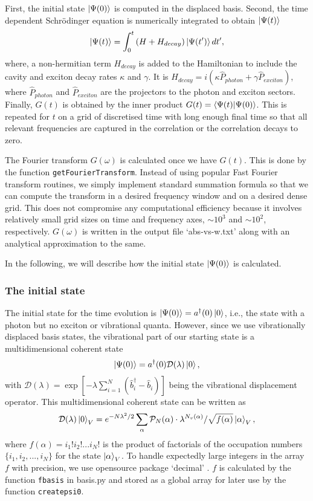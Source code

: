 \documentclass[final,twocolumn]{elsarticle}
\newcommand{\bd}{\hat{b}^\dagger}
\newcommand{\bn}{\hat{b}^{}}
\newcommand{\cntset}{\mathcal{P}_N}
\begin{document}
\begin{small}
First, the initial state $\ket{\Psi(0)}$ is computed in the displaced basis.
Second,
the time dependent 
Schr\"{o}dinger equation is numerically integrated
to obtain $\ket{\Psi(t)}$
\begin{displaymath}
\ket{\Psi(t)} = \int_0^t { (H+H_{decay})\ket{\Psi(t^\prime)} dt^\prime},
\end{displaymath}
where, 
a non-hermitian term $H_{decay}$ is added to the Hamiltonian 
to include the cavity and exciton decay rates
$\kappa$ and $\gamma$.
It is $H_{decay} = i (\kappa \hat P_{photon} + \gamma \hat P_{exciton}) $, where $ \hat P_{photon}$ and $ \hat P_{exciton}$ are the projectors to the photon and exciton sectors.
Finally, $G(t)$ is obtained by the inner product
$G(t) = \bra{\Psi(t)}\ket{\Psi(0)}$.
This is repeated for $t$ on a grid of discretised time with long enough final time so that all relevant frequencies are captured in the correlation or the correlation decays to 
zero. 

The Fourier transform $G(\omega)$ is calculated once we have $G(t)$.
This is done by the function \texttt{getFourierTransform}.
Instead of using popular Fast Fourier transform routines,
we simply implement standard summation formula
so that we can compute the transform in a desired frequency window
and on a desired dense grid. 
This does not compromise any computational efficiency
because it involves relatively small grid sizes on time and frequency axes, $\sim 10^3$ and $\sim 10^2$, respectively.
$G(\omega)$ is written in the output file 
`abs-vs-w.txt' along with an analytical approximation \cite{cwik} to the same.


In the following, we will describe how the initial state $\ket{\Psi(0)}$ is calculated.

\subsubsection{The initial state}
The initial state for the time evolution is $\ket{\Psi(0)}=a^\dagger(0) \ket{0}$, i.e.,
the state with a photon but no exciton or vibrational quanta.
However, since we use vibrationally displaced basis states,
the vibrational part of our starting state is a multidimensional coherent state
\begin{displaymath}
\ket{\Psi(0)}=a^\dagger(0)\mathcal{D}(\lambda)\ket{0},
\end{displaymath}
with $\mathcal{D}(\lambda)=\exp[-\lambda\sum_{i=1}^N{(\bd_i-\bn_i)}]$
being the vibrational
displacement operator.
This multidimensional coherent state can be written as
\begin{displaymath}
\mathcal{D}(\lambda)\ket{0}_V = e^{-N\lambda^2/2}\sum_\alpha{\cntset(\alpha)\cdot\lambda^{N_v(\alpha)}/\sqrt{f(\alpha)}}\ket{\alpha}_V,
\end{displaymath}
where
$f(\alpha) = i_1! i_2!...i_N!$ is the product of factorials of 
the occupation numbers $\{i_1,i_2,...,i_N\}$ for the state $\ket{\alpha}_V$.
To handle expectedly large integers in the array $f$ with precision, 
we use opensource package `decimal' \cite{decimal}. 
$f$ is calculated by the function \texttt{fbasis} in basis.py and stored as a global array for later use by
the function \texttt{createpsi0}. 


\end{small}
\end{document}
